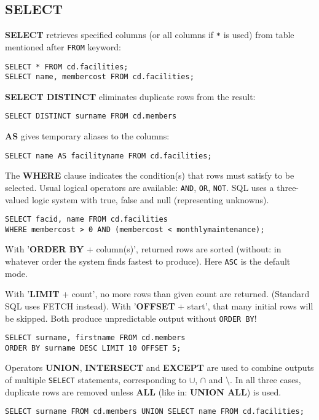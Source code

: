 %

\color{black}
\subsection{SELECT}
\textbf{SELECT} retrieves specified columns (or all columns if \texttt{*} is used) from table mentioned after \texttt{FROM} keyword:
\begin{verbatim}
SELECT * FROM cd.facilities;
SELECT name, membercost FROM cd.facilities;
\end{verbatim}

\textbf{SELECT DISTINCT} eliminates duplicate rows from the result:
\begin{verbatim}
SELECT DISTINCT surname FROM cd.members
\end{verbatim}

\textbf{AS} gives temporary aliases to the columns:
\begin{verbatim}
SELECT name AS facilityname FROM cd.facilities;
\end{verbatim}

The \textbf{WHERE} clause indicates the condition(s) that rows must satisfy to be selected. 
Usual logical operators are available: \texttt{AND}, \texttt{OR}, \texttt{NOT}.
SQL uses a three-valued logic system with true, false and null (representing unknowns).
\begin{verbatim}
SELECT facid, name FROM cd.facilities
WHERE membercost > 0 AND (membercost < monthlymaintenance);
\end{verbatim}

With '\textbf{ORDER BY} + column(s)', returned rows are sorted (without: in whatever order the system finds fastest to produce).
Here \texttt{ASC} is the default mode.

With '\textbf{LIMIT} + count', no more rows than given count are returned.
{\color{gray}(Standard SQL uses FETCH instead).}
With '\textbf{OFFSET} + start', that many initial rows will be skipped.
Both produce unpredictable output without \texttt{ORDER BY}!

\begin{verbatim}
SELECT surname, firstname FROM cd.members
ORDER BY surname DESC LIMIT 10 OFFSET 5;
\end{verbatim}

Operators \textbf{UNION}, \textbf{INTERSECT} and \textbf{EXCEPT} are used to combine outputs of multiple \texttt{SELECT} statements, corresponding to $\cup$, $\cap$ and $\setminus$.
In all three cases, duplicate rows are removed unless \textbf{ALL} (like in: \textbf{UNION ALL}) is used.
\begin{verbatim}
SELECT surname FROM cd.members UNION SELECT name FROM cd.facilities;
\end{verbatim}

%